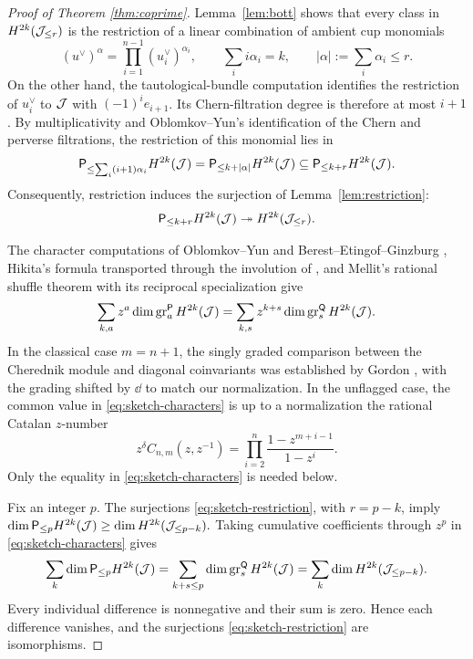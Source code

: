 \documentclass[a4paper,11pt,leqno]{amsart}
\begin{document}
\begin{proof}[Proof of Theorem \ref{thm:coprime}]
Lemma~\ref{lem:bott} shows that every class in
$H^{2k}(\mathcal J_{\le r})$ is the restriction of a linear combination
of ambient cup monomials
\[
 (u^\vee)^\alpha=\prod_{i=1}^{n-1}(u_i^\vee)^{\alpha_i},
 \qquad
 \sum_i i\alpha_i=k,\qquad
 |\alpha|:=\sum_i\alpha_i\le r.
\]
On the other hand, the tautological-bundle computation identifies
the restriction of $u_i^\vee$ to $\mathcal J$ with $(-1)^ie_{i+1}$.
Its Chern-filtration degree is therefore at most $i+1$.
By multiplicativity and Oblomkov--Yun's identification of the
Chern and perverse filtrations, the restriction of this monomial
lies in
\[
 \mathsf{P}_{\le\sum_i(i+1)\alpha_i}H^{2k}(\mathcal J)
 =
 \mathsf{P}_{\le k+|\alpha|}H^{2k}(\mathcal J)
 \subseteq \mathsf{P}_{\le k+r}H^{2k}(\mathcal J).
\]
Consequently, restriction induces the surjection of
Lemma~\ref{lem:restriction}:
\begin{equation}\label{eq:sketch-restriction}
 \mathsf{P}_{\le k+r}H^{2k}(\mathcal J)
 \twoheadrightarrow H^{2k}(\mathcal J_{\le r}).
\end{equation}

The character computations of Oblomkov--Yun
\cite{OY16,OY17} and Berest--Etingof--Ginzburg \cite{BEG},
Hikita's formula transported through the involution of
\cite[Theorem~8.3]{KTpublished}, and Mellit's rational shuffle
theorem with its reciprocal specialization
\cite{Hikita,Mellit,GLWX} give
\begin{equation}\label{eq:sketch-characters}
 \sum_{k,a}z^a\dim\operatorname{gr}^{\mathsf{P}}_aH^{2k}(\mathcal J)
 =
 \sum_{k,s}z^{k+s}\dim\operatorname{gr}^{\mathsf{Q}}_sH^{2k}(\mathcal J).
\end{equation}
In the classical case $m=n+1$, the singly graded comparison between
the Cherednik module and diagonal coinvariants was established by
Gordon \cite[\S5]{Gordon}, with the grading shifted by $\dd$ to match
our normalization. In the unflagged case, the common value in
\eqref{eq:sketch-characters} is up to a normalization the rational Catalan $z$-number
\[
z^{\delta}C_{n,m}(z,z^{-1})=\prod_{i=2}^{n}\frac{1-z^{m+i-1}}{1-z^i}.
\]
Only the equality in \eqref{eq:sketch-characters} is needed below.

Fix an integer $p$. The surjections
\eqref{eq:sketch-restriction}, with $r=p-k$, imply
$
 \dim \mathsf{P}_{\le p}H^{2k}(\mathcal J)
 \ge \dim H^{2k}(\mathcal J_{\le p-k}).
$
Taking cumulative coefficients through
$z^p$ in \eqref{eq:sketch-characters} gives
\[
 \sum_k\dim \mathsf{P}_{\le p}H^{2k}(\mathcal J)=\sum_{k+s\le p}
       \dim\operatorname{gr}^{\mathsf{Q}}_sH^{2k}(\mathcal J)=\sum_k\dim H^{2k}(\mathcal J_{\le p-k}).
\]
Every individual difference is nonnegative and their sum is zero.
Hence each difference vanishes, and the surjections
\eqref{eq:sketch-restriction} are isomorphisms.


\end{proof}
\end{document}
